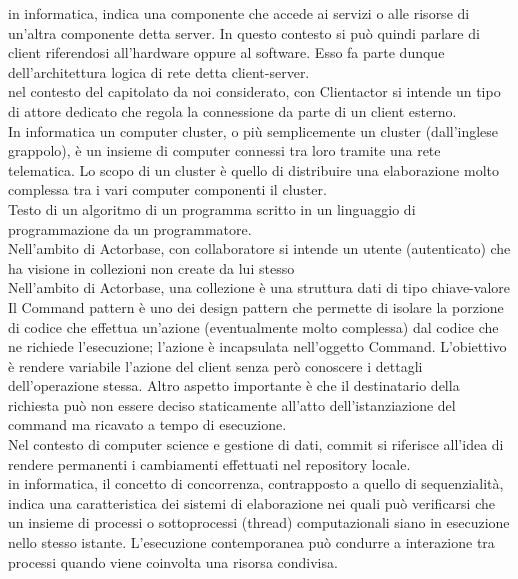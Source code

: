 \documentclass{scalatekids-article}
\begin{document}
 in informatica, indica una componente che accede ai servizi o alle risorse di un'altra componente detta server. In questo contesto si può quindi parlare di client riferendosi all'hardware oppure al software. Esso fa parte dunque dell'architettura logica di rete detta client-server.
\\

 nel contesto del capitolato da noi considerato, con Clientactor si intende un tipo di attore dedicato che regola la connessione da parte di un client esterno. 
\\

 In informatica un computer cluster, o più semplicemente un cluster (dall'inglese grappolo), è un insieme di computer connessi tra loro tramite una rete telematica. Lo scopo di un cluster è quello di distribuire una elaborazione molto complessa tra i vari computer componenti il cluster. 
\\

 Testo di un algoritmo di un programma scritto in un linguaggio di programmazione da un programmatore.
\\

 Nell'ambito di Actorbase, con collaboratore si intende un utente (autenticato) che ha visione in collezioni non create da lui stesso
\\

 Nell'ambito di Actorbase, una collezione è una struttura dati di tipo chiave-valore
\\

 Il Command pattern è uno dei design pattern che permette di isolare la porzione di codice che effettua un'azione (eventualmente molto complessa) dal codice che ne richiede l'esecuzione; l'azione è incapsulata nell'oggetto Command.
L'obiettivo è rendere variabile l'azione del client senza però conoscere i dettagli dell'operazione stessa. Altro aspetto importante è che il destinatario della richiesta può non essere deciso staticamente all'atto dell'istanziazione del command ma ricavato a tempo di esecuzione.
\\

 Nel contesto di computer science e gestione di dati, commit si riferisce all'idea di rendere permanenti i cambiamenti effettuati nel repository locale.
\\

 in informatica, il concetto di concorrenza, contrapposto a quello di sequenzialità, indica una caratteristica dei sistemi di elaborazione nei quali può verificarsi che un insieme di processi o sottoprocessi (thread) computazionali siano in esecuzione nello stesso istante.
L'esecuzione contemporanea può condurre a interazione tra processi quando viene coinvolta una risorsa condivisa.
\\
\end{document}
